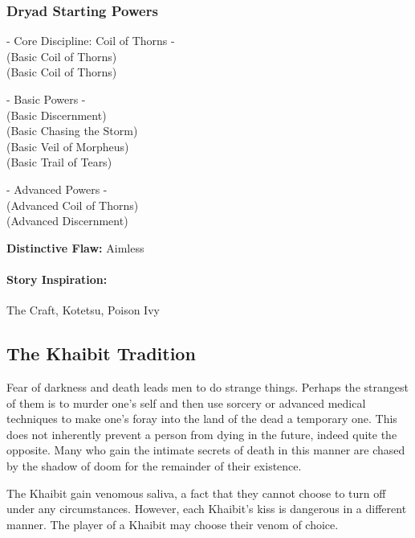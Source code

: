 \subsubsection{Dryad Starting Powers}

\hspace{\parindent} - Core Discipline: Coil of Thorns -\\
 (Basic Coil of Thorns)\\
 (Basic Coil of Thorns)

- Basic Powers -\\
 (Basic Discernment)\\
 (Basic Chasing the Storm)\\
 (Basic Veil of Morpheus)\\
 (Basic Trail of Tears)

- Advanced Powers -\\
 (Advanced Coil of Thorns)\\
 (Advanced Discernment)

\textbf{Distinctive Flaw:} Aimless

\paragraph{Story Inspiration:} The Craft, Kotetsu, Poison Ivy

\subsection[Khaibit]{The Khaibit Tradition} 

Fear of darkness and death leads men to do strange things. Perhaps the strangest of them is to murder one's self and then use sorcery or advanced medical techniques to make one's foray into the land of the dead a temporary one. This does not inherently prevent a person from dying in the future, indeed quite the opposite. Many who gain the intimate secrets of death in this manner are chased by the shadow of doom for the remainder of their existence.

The Khaibit gain venomous saliva, a fact that they cannot choose to turn off under any circumstances. However, each Khaibit's kiss is dangerous in a different manner. The player of a Khaibit may choose their venom of choice.

